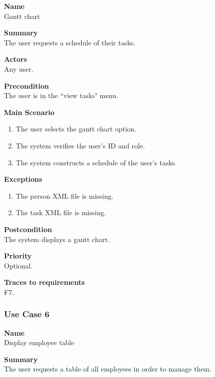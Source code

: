 \documentclass[12pt]{article}
\begin{document}
\noindent
{\bf Name}\\
Gantt chart

\noindent
{\bf Summary}\\
The user requests a schedule of their tasks.

\noindent
{\bf Actors}\\
Any user.

\noindent
{\bf Precondition}\\
The user is in the ``view tasks" menu.

\noindent
{\bf Main Scenario}\\
\vspace*{-0.35in}
\begin{enumerate}
\item The user selects the gantt chart option.
\vspace*{-0.1in}
\item The system verifies the user's ID and role.
\vspace*{-0.1in}
\item The system constructs a schedule of the user's tasks.
\end{enumerate}
\vspace*{-0.1in}

\noindent
{\bf Exceptions}\\
\vspace*{-0.35in}
\begin{enumerate}
\item The person XML file is missing.
\vspace*{-0.1in}
\item The task XML file is missing.
\end{enumerate}
\vspace*{-0.1in}

\noindent
{\bf Postcondition}\\
The system displays a gantt chart.

\noindent
{\bf Priority}\\
Optional.

\noindent
{\bf Traces to requirements}\\
F7.

\subsubsection{Use Case 6} \label{uc:6}

\noindent
{\bf Name}\\
Display employee table

\noindent
{\bf Summary}\\
The user requests a table of all employees in order to manage them.
\end{document}
